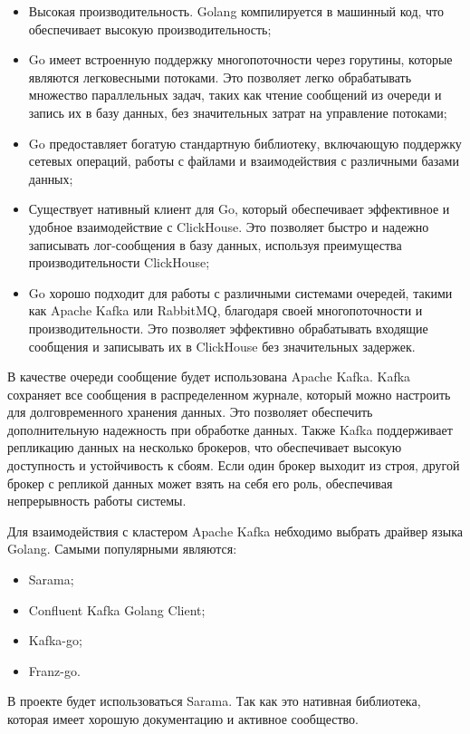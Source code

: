 \documentclass[14pt, russian]{scrartcl}
\begin{document}
\begin{itemize}
	\item Высокая производительность. Golang компилируется в машинный код, что обеспечивает высокую производительность;
	\item Go имеет встроенную поддержку многопоточности через горутины, которые являются легковесными потоками. Это позволяет легко обрабатывать множество параллельных задач, таких как чтение сообщений из очереди и запись их в базу данных, без значительных затрат на управление потоками;
	\item Go предоставляет богатую стандартную библиотеку, включающую поддержку сетевых операций, работы с файлами и взаимодействия с различными базами данных;
	\item Существует нативный клиент для Go, который обеспечивает эффективное и удобное взаимодействие с ClickHouse. Это позволяет быстро и надежно записывать лог-сообщения в базу данных, используя преимущества производительности ClickHouse;
	\item Go хорошо подходит для работы с различными системами очередей, такими как Apache Kafka или RabbitMQ, благодаря своей многопоточности и производительности. Это позволяет эффективно обрабатывать входящие сообщения и записывать их в ClickHouse без значительных задержек.
\end{itemize}

В качестве очереди сообщение будет использована Apache Kafka. Kafka сохраняет
все сообщения в распределенном журнале,
который можно настроить для долговременного хранения данных. Это позволяет обеспечить
дополнительную надежность при обработке данных. Также Kafka поддерживает репликацию данных на несколько брокеров,
что обеспечивает высокую доступность и устойчивость к сбоям.
Если один брокер выходит из строя, другой брокер с репликой данных может взять на себя его роль,
обеспечивая непрерывность работы системы.

Для взаимодействия с кластером Apache Kafka небходимо выбрать драйвер языка Golang.
Самыми популярными являются:

\begin{itemize}
	\item Sarama;
	\item Confluent Kafka Golang Client;
	\item Kafka-go;
	\item Franz-go.
\end{itemize}


В проекте будет использоваться Sarama. Так как
это нативная библиотека, которая имеет хорошую
документацию и активное сообщество.
\end{document}

